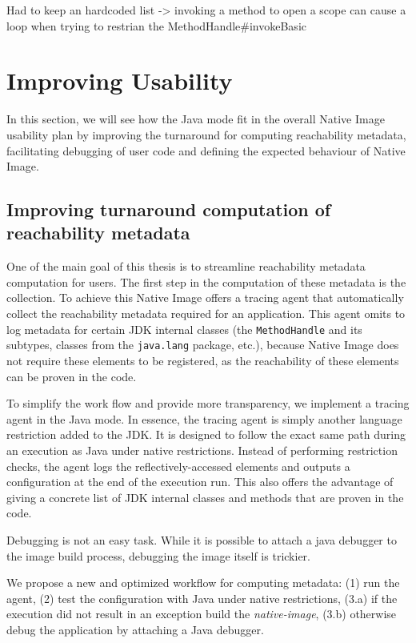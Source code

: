 Had to keep an hardcoded list -> invoking a method to open a scope can cause a loop when trying to restrian the MethodHandle#invokeBasic
\section{Improving Usability}
In this section, we will see how the Java mode fit in the overall Native Image usability plan by improving the turnaround for computing reachability metadata, facilitating debugging of user code and defining the expected behaviour of Native Image. 

\subsection{Improving turnaround computation of reachability metadata}
One of the main goal of this thesis is to streamline reachability metadata computation for users.
The first step in the computation of these metadata is the collection. To achieve this Native Image offers a tracing agent that automatically collect the reachability metadata required for an application. This agent omits to log metadata for certain JDK internal classes (the \verb|MethodHandle| and its subtypes, classes from the \verb|java.lang| package, etc.), because Native Image does not require these elements to be registered, as the reachability of these elements can be proven in the code.  

To simplify the work flow and provide more transparency, we implement a tracing agent in the Java mode. In essence, the tracing agent is simply another language restriction added to the JDK. It is designed to follow the exact same path during an execution as Java under native restrictions. Instead of performing restriction checks, the agent logs the reflectively-accessed elements and outputs a configuration at the end of the execution run.
This also offers the advantage of giving a concrete list of JDK internal classes and methods that are proven in the code.

Debugging is not an easy task. While it is possible to attach a java debugger to the image build process, debugging the image itself is trickier. 

We propose a new and optimized workflow for computing metadata: (1) run the agent, (2) test the configuration with Java under native restrictions, (3.a) if the execution did not result in an exception build the \textit{native-image}, (3.b) otherwise debug the application by attaching a Java debugger.


